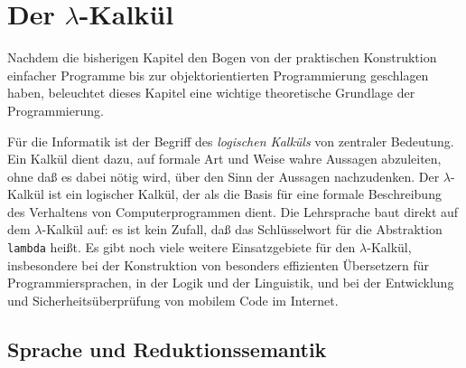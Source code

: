 
\chapter{Der $\lambda$-Kalkül}
\label{chap:lambda}


Nachdem die bisherigen Kapitel den Bogen von der praktischen Konstruktion
einfacher Programme bis zur
objektorientierten Programmierung geschlagen haben, beleuchtet dieses Kapitel
eine wichtige theoretische Grundlage der
Programmierung.

Für die Informatik ist der Begriff des \emph{logischen Kalküls} von zentraler Bedeutung.
Ein Kalkül dient dazu, auf formale Art und Weise wahre Aussagen abzuleiten, ohne daß
es dabei nötig wird, über den Sinn der Aussagen nachzudenken.   
Der $\lambda$-Kalkül ist ein logischer Kalkül, der als die Basis für
eine formale Beschreibung des Verhaltens von Computerprogrammen dient.
Die Lehrsprache baut direkt auf dem $\lambda$-Kalkül auf: es ist kein
Zufall, daß das Schlüsselwort für die Abstraktion \texttt{lambda}
heißt.  Es gibt noch viele weitere Einsatzgebiete für den $\lambda$-Kalkül,
insbesondere bei der Konstruktion von besonders effizienten
Übersetzern für Programmiersprachen, in der Logik und der Linguistik,
und bei der Entwicklung und Sicherheitsüberprüfung von mobilem Code im
Internet.

\section{Sprache und Reduktionssemantik}
\label{sec:sprache}

